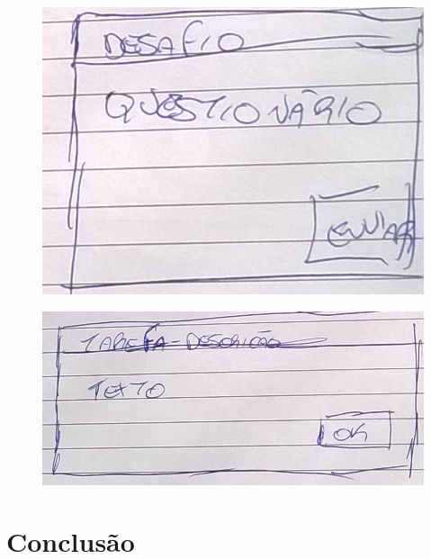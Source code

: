 \documentclass[
	12pt,				%
	oneside,			%
	a4paper,			%
	english,			%
	french,				%
	spanish,			%
	brazil,				%
	]{abntex2}
\begin{document}
\begin{figure}[ht]
\centering
\includegraphics[width=1\textwidth]{imagens/proposta_desafio_questionario.png}
\end{figure}

\begin{figure}[ht]
\centering
\includegraphics[width=1\textwidth]{imagens/proposta_tarefa_descricao.png}
\end{figure}

% 

\chapter*[Conclusão]{Conclusão}

\lipsum[31-33]

\postextual






\printindex
\end{document}
